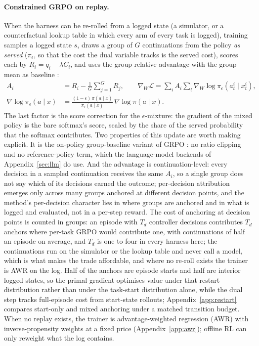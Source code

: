 \documentclass[10pt]{article}
\begin{document}
\paragraph{Constrained GRPO on replay.} When the harness can be re-rolled from a logged state (a simulator, or a counterfactual lookup table in which every arm of every task is logged), training samples a logged state $s$, draws a group of $G$ continuations from the policy \emph{as served} ($\pi_\epsilon$, so that the cost the dual variable tracks is the served cost), scores each by $R_i=q_i-\lambda C_i$, and uses the group-relative advantage with the group mean as baseline \citep{shao2024grpo}:
\begin{align}
A_i&=R_i-\frac{1}{G}\sum_{j=1}^G R_j,\qquad
\nabla_W\mathcal{L}=\sum_i A_i\sum_t\nabla_W\log\pi_\epsilon(a^i_t\mid x^i_t),
\label{eq:grpo}\\
\nabla\log\pi_\epsilon(a\mid x)&=\frac{(1-\epsilon)\,\pi(a\mid x)}{\pi_\epsilon(a\mid x)}\,\nabla\log\pi(a\mid x).
\label{eq:epsscore}
\end{align}
The last factor is the score correction for the $\epsilon$-mixture: the gradient of the mixed policy is the bare softmax's score, scaled by the share of the served probability that the softmax contributes. Two properties of this update are worth making explicit. It is the on-policy group-baseline variant of GRPO \citep{shao2024grpo}: no ratio clipping and no reference-policy term, which the language-model backends of Appendix~\ref{sec:llm} do use. And the advantage is continuation-level: every decision in a sampled continuation receives the same $A_i$, so a single group does not say which of its decisions earned the outcome; per-decision attribution emerges only across many groups anchored at different decision points, and the method's per-decision character lies in where groups are anchored and in what is logged and evaluated, not in a per-step reward. The cost of anchoring at decision points is counted in groups: an episode with $T_d$ controller decisions contributes $T_d$ anchors where per-task GRPO would contribute one, with continuations of half an episode on average, and $T_d$ is one to four in every harness here; the continuations run on the simulator or the lookup table and never call a model, which is what makes the trade affordable, and where no re-roll exists the trainer is AWR on the log. Half of the anchors are episode starts and half are interior logged states, so the primal gradient optimises value under that restart distribution rather than under the task-start distribution alone, while the dual step tracks full-episode cost from start-state rollouts; Appendix~\ref{app:restart} compares start-only and mixed anchoring under a matched transition budget. When no replay exists, the trainer is advantage-weighted regression (AWR) with inverse-propensity weights at a fixed price (Appendix~\ref{app:awr}); offline RL can only reweight what the log contains.
\end{document}
